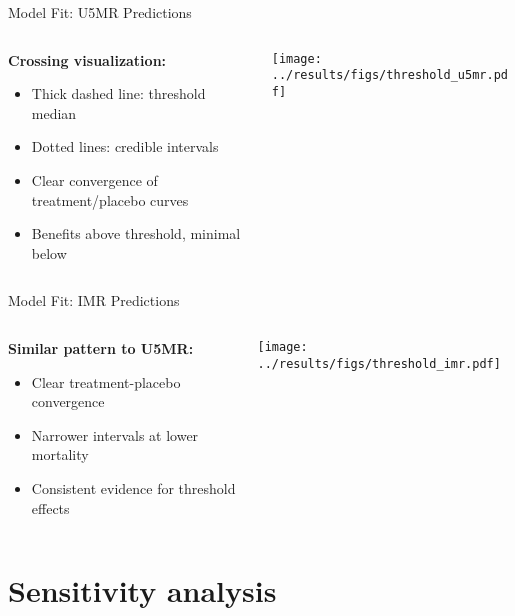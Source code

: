 \documentclass[aspectratio=169]{beamer}\usepackage[]{graphicx}\usepackage[dvipsnames]{xcolor}
\begin{document}
\begin{frame}{Model Fit: U5MR Predictions}
\begin{columns}
\begin{column}{0.35\textwidth}
\textbf{Crossing visualization:}
\begin{itemize}
  \item Thick dashed line: threshold median
  \item Dotted lines: credible intervals
  \item Clear convergence of treatment/placebo curves
  \item Benefits above threshold, minimal below
\end{itemize}
\end{column}
\begin{column}{0.65\textwidth}
\begin{center}
\texttt{[image: ../results/figs/threshold\_u5mr.pdf]}
\end{center}
\end{column}
\end{columns}
\end{frame}

\begin{frame}{Model Fit: IMR Predictions}
\begin{columns}
\begin{column}{0.35\textwidth}
\textbf{Similar pattern to U5MR:}
\begin{itemize}
  \item Clear treatment-placebo convergence
  \item Narrower intervals at lower mortality
  \item Consistent evidence for threshold effects
\end{itemize}
\end{column}
\begin{column}{0.65\textwidth}
\begin{center}
\texttt{[image: ../results/figs/threshold\_imr.pdf]}
\end{center}
\end{column}
\end{columns}
\end{frame}

\section{Sensitivity analysis}
\end{document}
